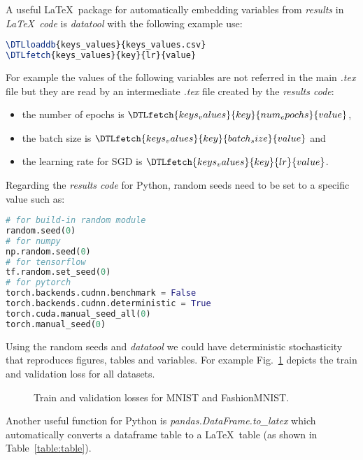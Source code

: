 \documentclass[journal]{IEEEtran}
\begin{document}
A useful \LaTeX\ package for automatically embedding variables from \textit{results} in \textit{\LaTeX\ code} is \textit{datatool} with the following example use:
\begin{lstlisting}[language=TeX, style=lststyle, caption={\LaTeX\ datatool example of loading a file that contains pairs of keys and values (keys\_values.csv) generated by a \textit{results code} and getting the value of a key named lr.}, captionpos=b]
\DTLloaddb{keys_values}{keys_values.csv}
\DTLfetch{keys_values}{key}{lr}{value}
\end{lstlisting}

For example the values of the following variables are not referred in the main \textit{.tex} file but they are read by an intermediate \textit{.tex} file created by the \textit{results code}:
\begin{itemize}
	\item the number of epochs is $\DTLfetch{keys_values}{key}{num_epochs}{value}$,
	\item the batch size is $\DTLfetch{keys_values}{key}{batch_size}{value}$ and
	\item the learning rate for SGD is $\DTLfetch{keys_values}{key}{lr}{value}$.
\end{itemize}

Regarding the \textit{results code} for Python, random seeds need to be set to a specific value such as:
\begin{lstlisting}[language=python, style=lststyle, caption={Python reproducibility commands for some popular libraries.}, captionpos=b]
# for build-in random module
random.seed(0)
# for numpy
np.random.seed(0)
# for tensorflow
tf.random.set_seed(0)
# for pytorch
torch.backends.cudnn.benchmark = False
torch.backends.cudnn.deterministic = True
torch.cuda.manual_seed_all(0)
torch.manual_seed(0)
\end{lstlisting}

Using the random seeds and \textit{datatool} we could have deterministic stochasticity that reproduces figures, tables and variables.
For example Fig.~\ref{fig:image} depicts the train and validation loss for all datasets.
\begin{figure}[!t]
	\caption{Train and validation losses for MNIST and FashionMNIST.}
	\label{fig:image}
\end{figure}

Another useful function for Python is \textit{pandas.DataFrame.to\_latex} which automatically converts a dataframe table to a \LaTeX\ table (as shown in Table~\ref{table:table}).
\end{document}
